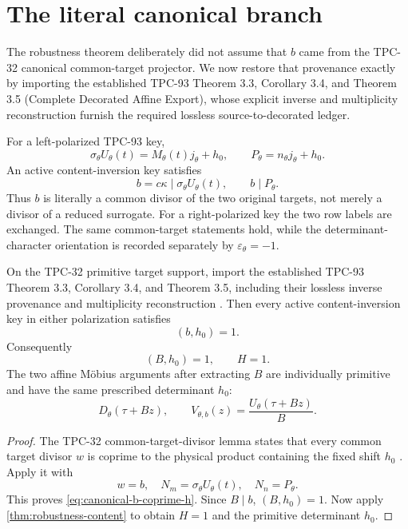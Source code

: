 \section{The literal canonical branch}
\label{sec:literal-canonical-branch}

The robustness theorem deliberately did not assume that \(b\) came
from the TPC-32 canonical common-target projector.  We now restore
that provenance exactly by importing the established TPC-93
Theorem 3.3, Corollary 3.4, and Theorem 3.5 (Complete Decorated
Affine Export), whose explicit inverse and multiplicity reconstruction
furnish the required lossless source-to-decorated ledger.

For a left-polarized TPC-93 key,
\[
 \sigma_\theta U_\theta(t)
 =
 M_\theta(t)j_\theta+h_0,
\qquad
 P_\theta=n_\theta j_\theta+h_0.
\]
An active content-inversion key satisfies
\[
 b=c\kappa\mid\sigma_\theta U_\theta(t),
 \qquad
 b\mid P_\theta.
\]
Thus \(b\) is literally a common divisor of the two original targets,
not merely a divisor of a reduced surrogate.
For a right-polarized key the two row labels are exchanged.  The
same common-target statements hold, while the determinant-character
orientation is recorded separately by
\(\varepsilon_\theta=-1\).

\begin{theorem}
\label{thm:canonical-H-one}
On the TPC-32 primitive target support, import the established
TPC-93 Theorem 3.3, Corollary 3.4, and Theorem 3.5, including their
lossless inverse provenance and multiplicity reconstruction
\citep{WangTPC93}.  Then
every active content-inversion key in either polarization satisfies
\begin{equation}
 (b,h_0)=1.
\label{eq:canonical-b-coprime-h}
\end{equation}
Consequently
\[
 (B,h_0)=1,\qquad H=1.
\]
The two affine M\"obius arguments after extracting \(B\) are
individually primitive and have the same prescribed determinant
\(h_0\):
\[
 D_\theta(\tau+Bz),\qquad
 V_{\theta,b}(z)=\frac{U_\theta(\tau+Bz)}B.
\]
\end{theorem}

\begin{proof}
The TPC-32 common-target-divisor lemma states that every common
target divisor \(w\) is coprime to the physical product containing
the fixed shift \(h_0\) \citep{WangTPC32}.  Apply it with
\[
 w=b,\quad
 N_m=\sigma_\theta U_\theta(t),\quad
 N_n=P_\theta.
\]
This proves \eqref{eq:canonical-b-coprime-h}.  Since \(B\mid b\),
\((B,h_0)=1\).  Now apply
\cref{thm:robustness-content} to obtain \(H=1\) and the primitive
determinant \(h_0\).
\end{proof}

